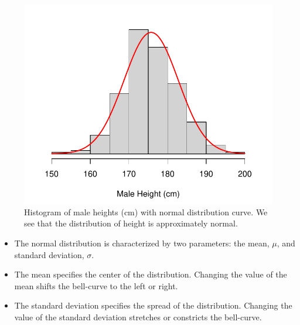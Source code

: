 \documentclass{beamer}
\begin{document}
\begin{frame}
\begin{figure}
\includegraphics[scale = 0.5]{figure/height_hist_norm.pdf}
\caption{Histogram of male heights (cm) with normal distribution curve. We see that the distribution of height is approximately normal.}
\end{figure}
\end{frame}


\begin{frame}
\begin{itemize}
\item The normal distribution is characterized by two parameters: the mean, $\mu$, and standard deviation, $\sigma$.
\vspace{5pt}
\item The mean specifies the center of the distribution.  Changing the value of the mean shifts the bell-curve to the left or right.
\vspace{5pt}
\item The standard deviation specifies the spread of the distribution.  Changing the value of the standard deviation stretches or constricts the bell-curve.
\end{itemize}
\end{frame}
\end{document}
